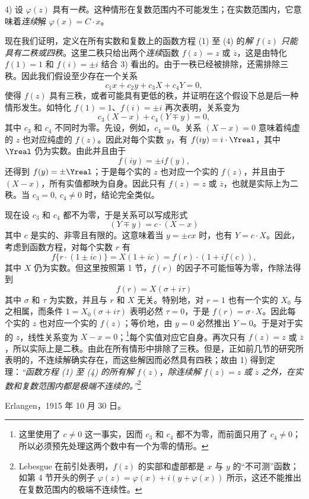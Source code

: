 4) 设 $\varphi(z)$ 具有\emph{一秩}。这种情形在复数范围内不可能发生；在实数范围内，它意味着\emph{连续}解 $\varphi(x)=C\cdot x$。

现在我们证明，定义在所有实数和复数上的函数方程 (1) 至 (4) 的\emph{解} $f(z)$ \emph{只能具有二秩或四秩}。这里二秩只给出两个\emph{连续}函数 $f(z)=z$ 或 $\overline z$，这是由特化 $f(1)=1$ 和 $f(i)=\pm i$ 结合 3) 看出的。由于一秩已经被排除，还需排除三秩。因此我们假设至少存在一个关系
\[
c_1x+c_2y+c_3X+c_4Y=0,
\]
使得 $f(z)$ 具有三秩，或者可能具有更低的秩，并证明在这个假设下总是后一种情形发生。如特化 $f(1)=1$、$f(i)=\pm i$ 再次表明，关系变为
\[
c_3(X-x)+c_4(Y\mp y)=0,
\]
其中 $c_3$ 和 $c_4$ 不同时为零。先设，例如，$c_4=0$。关系 $(X-x)=0$ 意味着纯虚的 $z$ 也对应纯虚的 $f(z)$。因此对每个实数 $y$，有 $f(iy)=i\cdot\Yreal$，其中 $\Yreal$ 仍为实数。由此并且由于
\[
f(iy)=\pm i f(y),
\]
还得到 $f(y)=\pm\Yreal$；于是每个实的 $z$ 也对应一个实的 $f(z)$，并且由于 $(X-x)$，所有实值都映为自身。因此只有 $f(z)=z$ 或 $\overline z$，也就是实际上为二秩。当 $c_3=0$, $c_4\ne0$ 时，结论完全类似。

现在设 $c_3$ 和 $c_4$ 都不为零，于是关系可以写成形式
\[
(Y\mp y)=c\cdot(X-x)
\]
其中 $c$ 是实的、非零且有限的。这意味着当 $y=\pm cx$ 时，也有 $Y=c\cdot X$。因此，考虑到函数方程，对每个实数 $r$ 有
\[
f\{r\cdot(1\pm ic)\}=X(1+ic)=f(r)\cdot(1+i f(c)),
\]
其中 $X$ 仍为实数。但这里按照第 1 节，$f(r)$ 的因子不可能恒等为零，作除法得到
\[
f(r)=X(\sigma+i\tau)
\]
其中 $\sigma$ 和 $\tau$ 为实数，并且与 $r$ 和 $X$ 无关。特别地，对 $r=1$ 也有一个实的 $X_0$ 与之相属，而条件 $1=X_0(\sigma+i\tau)$ 表明必然 $\tau=0$，于是 $f(r)=\sigma\cdot X$。因此每个实的 $z$ 也对应一个实的 $f(z)$；等价地，由 $y=0$ 必然推出 $Y=0$。于是对于实的 $z$，线性关系变为 $X-x=0$；\footnote{这里使用了 $c\ne0$ 这一事实，因而 $c_3$ 和 $c_4$ 都不为零，而前面只用了 $c_4\ne0$；所以必须预先处理这两个数中有一个为零的情形。}每个实值对应它自身。再次只有 $f(z)=z$ 或 $\overline z$，所以实际上是二秩。由此在所有情形中排除了三秩。但是，正如前几节的研究所表明的，不连续解确实存在，而这些解因而必然具有四秩；故由 1) 得到定理：\emph{“函数方程 (1) 至 (4) 的所有解} $f(z)$，\emph{除连续解} $f(z)=z$ \emph{或} $\overline z$ \emph{之外，在实数和复数范围内都是极端不连续的。”}\footnote{Lebesgue 在前引处表明，$f(z)$ 的实部和虚部都是 $x$ 与 $y$ 的“不可测”函数；如第 4 节开头的例子 $\varphi(z)=\varphi(x)+i(y+\varphi(x))$ 所示，这还不能推出在复数范围内的极端不连续性。}

\medskip
\noindent Erlangen，1915 年 10 月 30 日。
